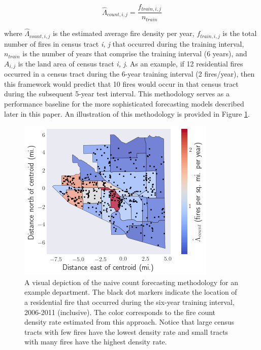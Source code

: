 \documentclass{svjour3}
\begin{document}
\begin{equation}
  \label{eqn:naive_count}
  \hat{\Lambda}_{count,i,j} = \frac{f_{train,i,j}}{n_{train}} 
\end{equation}

\noindent where $\hat{\Lambda}_{count,i,j}$ is the estimated average fire density per year, $f_{train,i,j}$ is the total number of fires in census tract \textit{i, j} that occurred during the training interval, $n_{train}$ is the number of years that comprise the training interval (6 years), and $A_{i,j}$ is the land area of census tract \textit{i, j}. As an example, if 12 residential fires occurred in a census tract during the 6-year training interval (2 fires/year), then this framework would predict that 10 fires would occur in that census tract during the subsequent 5-year test interval. This methodology serves as a performance baseline for the more sophisticated forecasting models described later in this paper. An illustration of this methodology is provided in Figure \ref{fig:spatial_histogram}. 


\begin{figure}[htb] \centering
\includegraphics[width=.5\textwidth]{./figures/spatial_histogram.png}
\caption{A visual depiction of the naive count forecasting methodology for an example department. The black dot markers indicate the location of a residential fire that occurred during the six-year training interval, 2006-2011 (inclusive). The color corresponds to the fire count density rate estimated from this approach. Notice that large census tracts with few fires have the lowest density rate and small tracts with many fires have the highest density rate.}
\label{fig:spatial_histogram}
\end{figure}
\end{document}
